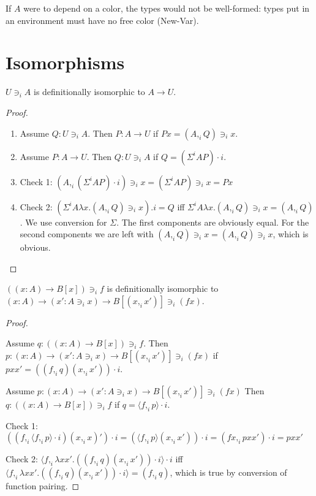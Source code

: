 \documentclass[english]{PaperTools/latex/lipics}
\newcommand\CP[3]{(#2,_{#1} #3)}
\newcommand\CSig[1]{\Sigma^{#1}}
\newcommand\param[1]{\!\cdot\!#1}
\newcommand\op[1]{∋_{#1}}
\newcommand\fp[3]{⟨#2 ,_{#1} #3⟩}
\begin{document}
If $A$ were to depend on a color, the types would not be well-formed:
types put in an environment must have no free color ({\sc New-Var}).

\section{Isomorphisms}


\begin{theorem}
$U \op i A$ is definitionally isomorphic to $A → U$.
\end{theorem}
\begin{proof}~
  \begin{enumerate}
  \item Assume $Q : U \op i A$. Then $P : A → U$ if $P x = \CP i A Q \op i x$.
  \item Assume $P : A → U$. Then $Q : U \op i A$ if $Q = (\CSig i A P) \param i$.
  \item Check 1: $\CP i A {(\CSig i A P) \param i} \op i x = (\CSig i A P) \op i x = P x$
  \item Check 2: $(\CSig i A {λx. \CP i A Q \op i x}).i = Q$ iff $\CSig i A {λx. \CP i A Q \op i x} = \CP i A Q$. We use conversion for $\Sigma$. The first components are obviously equal. For the second components we are left with $\CP i A Q \op i x = \CP i A Q \op i x$, which is obvious.
  \end{enumerate}
\end{proof}

\begin{theorem}
$((x:A) → B[x]) \op i f$ is definitionally isomorphic to $(x:A) → (x' : A \op i x) → B[\CP i x {x'}] \op i (f x)$.
\end{theorem}
\begin{proof}~
  \item Assume $q : ((x:A) → B[x]) \op i f$. Then $p : (x:A) → (x' : A \op i x) → B[\CP i x {x'}] \op i (f x)$ if $p x x' = (\CP i f q \CP i x {x'}) \param i$.
  \item Assume $p : (x:A) → (x' : A \op i x) → B[\CP i x {x'}] \op i (f x)$ Then $q : ((x:A) → B[x]) \op i f$ if $q = \fp i f p \param i$.
  \item Check 1: $(\CP i f {\fp i f p \param i} \CP i x x') \param i = ({\fp i f p} \CP i x {x'}) \param i = \CP i {f x} {p x x'} \param i = p x x' $
  \item Check 2: $\fp i f {λx x'. (\CP i f q \CP i x {x'}) \param i} \param i$ iff $\fp i f {λx x'. (\CP i f q \CP i x {x'}) \param i} = \CP i f q$, which is true by conversion of function pairing.
\end{proof}
\end{document}
